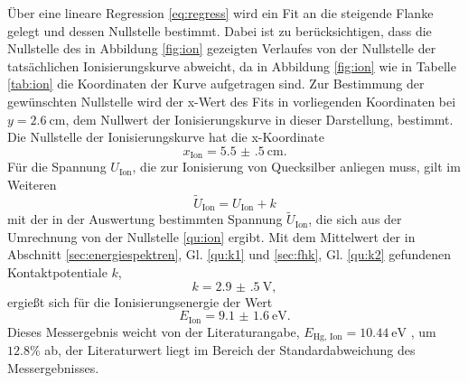 Über eine lineare Regression \eqref{eq:regress} wird ein Fit an die steigende Flanke gelegt und dessen Nullstelle bestimmt.
Dabei ist zu berücksichtigen, dass die Nullstelle des in Abbildung \ref{fig:ion} gezeigten Verlaufes von der Nullstelle der tatsächlichen Ionisierungskurve abweicht, da in Abbildung \ref{fig:ion} wie in Tabelle \ref{tab:ion} die Koordinaten der Kurve aufgetragen sind.
Zur Bestimmung der gewünschten Nullstelle wird der x-Wert des Fits in vorliegenden Koordinaten bei $y=\SI{2.6}{\centi\meter}$, dem Nullwert der Ionisierungskurve in dieser Darstellung, bestimmt.
Die Nullstelle der Ionisierungskurve hat die x-Koordinate%
\begin{equation}
	x_\text{Ion}=\SI{5.5(5)}{\centi\meter}.
	\label{qu:ion}
\end{equation}
Für die Spannung $U_\text{Ion}$, die zur Ionisierung von Quecksilber anliegen muss, gilt im Weiteren
\begin{equation}
	\tilde{U}_\text{Ion}=U_\text{Ion}+k
\end{equation}
mit der in der Auswertung bestimmten Spannung $\tilde{U}_\text{Ion}$, die sich aus der Umrechnung von der Nullstelle \ref{qu:ion} ergibt.
Mit dem Mittelwert der in Abschnitt \ref{sec:energiespektren}, Gl. \eqref{qu:k1} und \ref{sec:fhk}, Gl. \eqref{qu:k2} gefundenen Kontaktpotentiale $k$,
\begin{equation}
	k=\SI{2.9(5)}{\volt},
\end{equation}
ergießt sich für die Ionisierungsenergie der Wert
\begin{equation}
	E_\text{Ion}=\SI{9.1(16)}{\electronvolt}.
\end{equation}
Dieses Messergebnis weicht von der Literaturangabe, $E_\text{Hg, Ion}=\SI{10.44}{\electronvolt}$ \cite{IonHg}, um $12.8\%$ ab, 
der Literaturwert liegt im Bereich der Standardabweichung des Messergebnisses.



